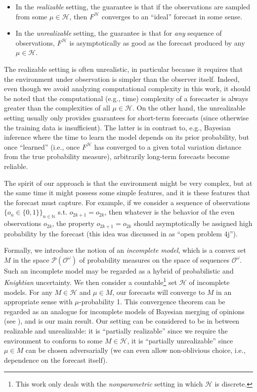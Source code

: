 \documentclass[11pt]{article}
\theoremstyle{definition}
\theoremstyle{plain}
\newcommand{\Nats}{\mathbb{N}}
\newcommand{\PM}{\mathcal{P}}
\newcommand{\Ob}{\mathcal{O}}
\newcommand{\OO}{\Ob^\omega}
\newcommand{\PMO}{\PM(\OO)}
\newcommand{\MC}{\mathcal{H}}
\begin{document}
\begin{itemize}
\item 
In the \emph{realizable} setting, the guarantee is that if the observations are sampled from some $\mu \in \MC$, then $F^\MC$ converges to an \enquote{ideal} forecast in some sense.
\item
In the \emph{unrealizable} setting, the guarantee is that for \emph{any} sequence of observations, $F^\MC$ is asymptotically as good as the forecast produced by any $\mu \in \MC$.
\end{itemize}

The realizable setting is often unrealistic, in particular because it requires that the environment under observation is simpler than the observer itself. Indeed, even though we avoid analyzing computational complexity in this work, it should be noted that the computational (e.g., time) complexity of a forecaster is always greater than the complexities of all $\mu \in \MC$. On the other hand, the unrealizable setting usually only provides guarantees for short-term forecasts (since otherwise the training data is insufficient). The latter is in contrast to, e.g., Bayesian inference where the time to learn the model depends on its prior probability, but once \enquote{learned} (i.e., once $F^\MC$ has converged to a given total variation distance from the true probability measure), arbitrarily long-term forecasts become reliable.

The spirit of our approach is that the environment might be very complex, but at the same time it might possess some simple features, and it is these features that the forecast must capture. For example, if we consider a sequence of observations $\{o_n \in \{0,1\}\}_{n \in \Nats}$ s.t. $o_{2k+1}=o_{2k}$, then whatever is the behavior of the even observations $o_{2k}$, the property $o_{2k+1}=o_{2k}$ should asymptotically be assigned high probability by the forecast (this idea was discussed in \cite{Hutter_2009} as \enquote{open problem 4j}).

Formally, we introduce the notion of an \emph{incomplete model}, which is a convex set $M$ in the space $\PMO$ of probability measures on the space of sequences $\OO$. Such an incomplete model may be regarded as a hybrid of probabilistic and \emph{Knightian} uncertainty. We then consider a countable\footnote{This work only deals with the \emph{nonparametric} setting in which $\MC$ is discrete.} set $\MC$ of incomplete models. For any $M \in \MC$ and $\mu \in M$, our forecasts will converge to $M$ in an appropriate sense with $\mu$-probability 1. This convergence theorem can be regarded as an analogue for incomplete models of Bayesian merging of opinions (see \cite{Blackwell_1962}), and is our main result. Our setting can be considered to be in between realizable and unrealizable: it is \enquote{partially realizable} since we require the environment to conform to some $M \in \MC$, it is \enquote{partially unrealizable} since $\mu \in M$ can be chosen adversarially (we can even allow non-oblivious choice, i.e., dependence on the forecast itself).
\end{document}
